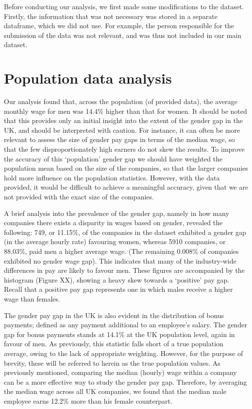 \documentclass[]{article}
\begin{document}
Before conducting our analysis, we first made some modifications to the
dataset. Firstly, the information that was not necessary was stored in a
separate dataframe, which we did not use. For example, the person
responsible for the submission of the data was not relevant, and was
thus not included in our main dataset.

\section{Population data analysis}\label{population-data-analysis}

Our analysis found that, across the population (of provided data), the
average monthly wage for men was 14.4\% higher than that for women. It
should be noted that this provides only an initial insight into the
extent of the gender gap in the UK, and should be interpreted with
caution. For instance, it can often be more relevant to assess the size
of gender pay gaps in terms of the median wage, so that the few
disproportionately high earners do not skew the results. To improve the
accuracy of this `population' gender gap we should have weighted the
population mean based on the size of the companies, so that the larger
companies hold more influence on the population statistics. However,
with the data provided, it would be difficult to achieve a meaningful
accuracy, given that we are not provided with the exact size of the
companies.

A brief analysis into the prevalence of the gender gap, namely in how
many companies there exists a disparity in wages based on gender,
revealed the following: 749, or 11.15\%, of the companies in the dataset
exhibited a gender gap (in the average hourly rate) favouring women,
whereas 5910 companies, or 88.03\%, paid men a higher average wage. (The
remaining 0.008\% of companies exhibited no gender wage gap). This
indicates that many of the industry-wide differences in pay are likely
to favour men. These figures are accompanied by the histogram (Figure
XX), showing a heavy skew towards a `positive' pay gap. Recall that a
positive pay gap represents one in which males receive a higher wage
than females.

The gender pay gap in the UK is also evident in the distribution of
bonus payments; defined as any payment additional to an employee's
salary. The gender gap for bonus payments stands at 14.1\% at the UK
population level, again in favour of men. As previously, this statistic
falls short of a true population average, owing to the lack of
appropriate weighting. However, for the purpose of brevity, these will
be referred to herein as the true population values. As previously
mentioned, comparing the median (hourly) wage within a company can be a
more effective way to study the gender pay gap. Therefore, by averaging
the median wage across all UK companies, we found that the median male
employee earns 12.2\% more than his female counterpart.
\end{document}
